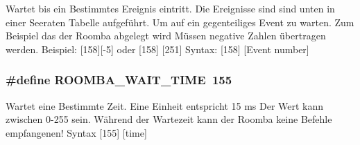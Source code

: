 Wartet bis ein Bestimmtes Ereignis eintritt. Die Ereignisse sind sind unten in einer Seeraten Tabelle aufgeführt. Um auf ein gegenteiliges Event zu warten. Zum Beispiel das der Roomba abgelegt wird Müssen negative Zahlen übertragen werden. Beispiel\-: \mbox{[}158\mbox{]}\mbox{[}-\/5\mbox{]} oder \mbox{[}158\mbox{]} \mbox{[}251\mbox{]} Syntax\-: \mbox{[}158\mbox{]} \mbox{[}Event number\mbox{]} \hypertarget{group__roomba__commands__script_ga4712c8a22bafc8e7104b2a207d9c967b}{
\subsubsection[{R\-O\-O\-M\-B\-A\-\_\-\-W\-A\-I\-T\-\_\-\-T\-I\-M\-E}]{\setlength{\rightskip}{0pt plus 5cm}\#define R\-O\-O\-M\-B\-A\-\_\-\-W\-A\-I\-T\-\_\-\-T\-I\-M\-E~155}}\label{group__roomba__commands__script_ga4712c8a22bafc8e7104b2a207d9c967b}
Wartet eine Bestimmte Zeit. Eine Einheit entspricht 15 ms Der Wert kann zwischen 0-\/255 sein. Während der Wartezeit kann der Roomba keine Befehle empfangenen! Syntax \mbox{[}155\mbox{]} \mbox{[}time\mbox{]} 